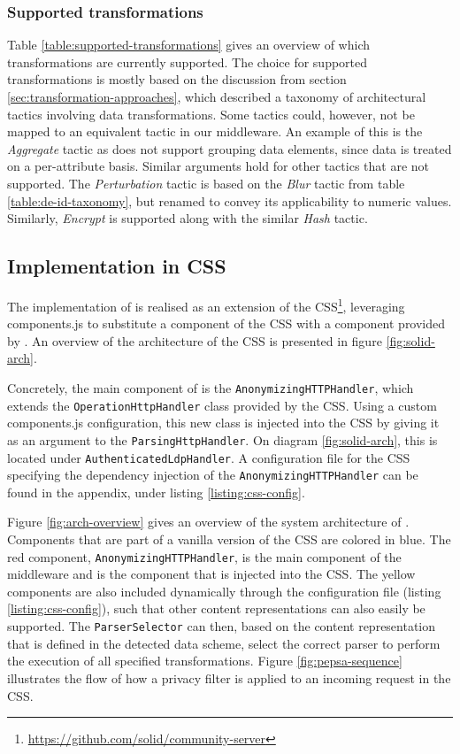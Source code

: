 

\subsubsection{Supported transformations}
Table \ref{table:supported-transformations} gives an overview of which transformations are currently supported. The choice for supported transformations is mostly based on the discussion from section \ref{sec:transformation-approaches}, which described a taxonomy of architectural tactics involving data transformations. Some tactics could, however, not be mapped to an equivalent tactic in our middleware. An example of this is the \textit{Aggregate} tactic as \middleware{} does not support grouping data elements, since data is treated on a per-attribute basis. Similar arguments hold for other tactics that are not supported. The \textit{Perturbation} tactic is based on the \textit{Blur} tactic from table \ref{table:de-id-taxonomy}, but renamed to convey its applicability to numeric values. Similarly, \textit{Encrypt} is supported along with the similar \textit{Hash} tactic.

\subsection{Implementation in CSS}
The implementation of \middleware{} is realised as an extension of the \acrlong{CSS}\footnote{\url{https://github.com/solid/community-server}}, leveraging components.js to substitute a component of the \gls{CSS} with a component provided by \middleware{}. An overview of the architecture of the \gls{CSS} is presented in figure \ref{fig:solid-arch}.

Concretely, the main component of \middleware{} is the \texttt{AnonymizingHTTPHandler}, which extends the \texttt{OperationHttpHandler} class provided by the \gls{CSS}. Using a custom components.js configuration, this new class is injected into the \gls{CSS} by giving it as an argument to the \texttt{ParsingHttpHandler}. On diagram \ref{fig:solid-arch}, this is located under \texttt{AuthenticatedLdpHandler}. A configuration file for the \gls{CSS} specifying the dependency injection of the \texttt{AnonymizingHTTPHandler} can be found in the appendix, under listing \ref{listing:css-config}.

Figure \ref{fig:arch-overview} gives an overview of the system architecture of \middleware{}. Components that are part of a vanilla version of the \gls{CSS} are colored in blue. The red component, \texttt{AnonymizingHTTPHandler}, is the main component of the middleware and is the component that is injected into the \gls{CSS}. The yellow components are also included dynamically through the configuration file (listing \ref{listing:css-config}), such that other content representations can also easily be supported. The \texttt{ParserSelector} can then, based on the content representation that is defined in the detected data scheme, select the correct parser to perform the execution of all specified transformations. 
Figure \ref{fig:pepsa-sequence} illustrates the flow of how a privacy filter is applied to an incoming request in the \gls{CSS}.

